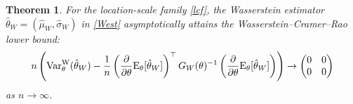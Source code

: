 \documentclass[11pt, a4paper]{article}
\newtheorem{theorem}{Theorem}
\begin{document}
\begin{theorem}\label{th: asymptotic efficiency}
	For the location-scale family \eqref{lcf}, the Wasserstein estimator $\hat{\theta}_W=(\hat{\mu}_W,\hat{\sigma}_W)$ in \eqref{West} asymptotically attains the Wasserstein--Cramer--Rao lower bound:
	\begin{align*}
		n \left( {\rm Var}_{\theta}^{\mathrm{W}}(\hat{\theta}_W) - \frac{1}{n} \left(\frac{\partial}{\partial \theta} {\rm E}_{\theta} [\hat{\theta}_W] \right)^\top G_W(\theta)^{-1} \left(\frac{\partial}{\partial \theta} {\rm E}_{\theta} [\hat{\theta}_W]\right) \right) \to \begin{pmatrix} 0 & 0 \\ 0 & 0 \end{pmatrix}
	\end{align*}
	as $n\to\infty$.
\end{theorem}
\end{document}
